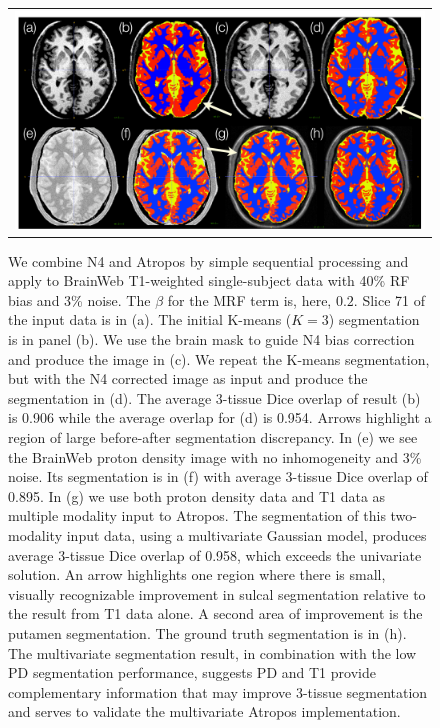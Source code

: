 \documentclass[11pt,english]{article}
\begin{document}
\begin{figure}
\begin{center}
\begin{tabular}{c}
\includegraphics[width=6in]{Figures/bwebN4ex.pdf}
\end{tabular}
\caption{\baselineskip 12pt \small We combine N4 and Atropos by simple
sequential processing and apply to BrainWeb T1-weighted single-subject
data with 40\% RF bias and 3\% noise.  The $\beta$ for the MRF term
is, here, $0.2$.  Slice 71 of the input data is in (a).  The initial
K-means ($K=3$) segmentation is in panel (b).  We use the brain mask
to guide N4 bias correction and produce the image in (c).  We
repeat the K-means segmentation, but with the N4 corrected image as
input and produce the segmentation in (d).  The average 3-tissue Dice
overlap of result (b) is 0.906 while the average overlap for (d) is
0.954.  Arrows highlight a region of large before-after segmentation
discrepancy.  In (e) we see the BrainWeb proton density image with no
inhomogeneity and 3\% noise.  Its segmentation is in (f) with average
3-tissue Dice overlap of 0.895.  In (g) we use both proton density
data and T1 data as multiple modality input to Atropos.  The segmentation
of this two-modality input data, using a multivariate Gaussian model,
produces average 3-tissue Dice overlap of 0.958, which exceeds
the univariate solution.  An arrow highlights one region where there
is small, visually recognizable improvement in sulcal segmentation
relative to the result from T1 data alone.  A second area of
improvement is the putamen segmentation.  The ground truth
segmentation is in (h).  The multivariate segmentation result, in
combination with the low PD segmentation performance, suggests PD and
T1 provide complementary information that may improve 3-tissue
segmentation and serves to validate the multivariate Atropos
implementation.
}
\label{fig:bwebrf40}
\end{center}
\end{figure}
\end{document}
